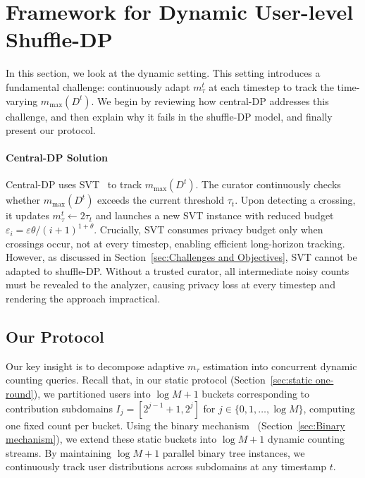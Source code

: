 \section{Framework for Dynamic User-level Shuffle-DP}

\label{sec:Framework for Dynamic User-level Shuffle-DP}


In this section, we look at the dynamic setting. 
This setting introduces a fundamental challenge: continuously adapt $m_\tau^t$ at each timestep to track the time-varying $m_{\max}(D^t)$.
We begin by reviewing how central-DP addresses this challenge, and then explain why it fails in the shuffle-DP model, and finally present our protocol.



\paragraph{Central-DP Solution}
\label{sec:dynamic centralDP solution}

Central-DP uses SVT~\cite{dong2023continual} to track $m_{\max}(D^t)$. 
The curator continuously checks whether $m_{\max}(D^t)$ exceeds the current threshold $\tau_t$. 
Upon detecting a crossing, it updates $m_\tau^t \leftarrow 2\tau_t$ and launches a new SVT instance with reduced budget $\varepsilon_i = \varepsilon\theta/(i+1)^{1+\theta}$. 
Crucially, SVT consumes privacy budget only when crossings occur, not at every timestep, enabling efficient long-horizon tracking.
However, as discussed in Section~\ref{sec:Challenges and Objectives}, SVT cannot be adapted to shuffle-DP. 
Without a trusted curator, all intermediate noisy counts must be revealed to the analyzer, causing privacy loss at every timestep and rendering the approach impractical.



\subsection{Our Protocol}



Our key insight is to decompose adaptive $m_\tau$ estimation into concurrent dynamic counting queries.
Recall that, in our static protocol (Section~\ref{sec:static one-round}), we partitioned users into $\log M+1$ buckets corresponding to contribution subdomains $I_j = [2^{j-1}+1, 2^j]$ for $j \in \{0, 1, \dots, \log M\}$, computing one fixed count per bucket. 
Using the binary mechanism~\cite{ghazi2021differentially} (Section~\ref{sec:Binary mechanism}), we extend these static buckets into $\log M+1$ dynamic counting streams. 
By maintaining $\log M+1$ parallel binary tree instances, we continuously track user distributions across subdomains at any timestamp $t$.



